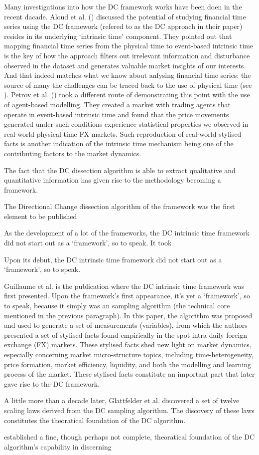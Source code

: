 Many investigations into how the DC framework works have been doen in the recent dacade. Aloud et al. (\citeyear{aloud2012directional}) discussed the potential of studying financial time series using the DC framework (refered to as the DC approach in their paper) resides in its underlying `intrinsic time' component. They pointed out that mapping financial time series from the physical time to event-based intrinsic time is the key of how the approach filters out irrelevant information and disturbance observed in the dataset and generates valuable market insights of our interests. And that indeed matches what we know about anlysing financial time series: the source of many the challenges can be traced back to the use of physical time (see \citeyear{genccay2001introduction}). Petrov et al. (\citeyear{petrov2018agent}) took a different route of demonstrating this point with the use of agent-based modelling. They created a market with trading agents that operate in event-based intrinsic time and found that the price movements generated under such conditions experience statistical properties we observed in real-world physical time FX markets. Such reproduction of real-world stylised facts is another indication of the intrinsic time mechanism being one of the contributing factors to the market dynamics. 


The fact that the DC dissection algorithm is able to extract qualitative and quantitative information has given rise to the methodology becoming a framework. 



The Directional Change dissection algorithm of the framework was the first element to be published 

As the development of a lot of the frameworks, the DC intrinsic time framework did not start out as a `framework', so to speak. It took

Upon its debut, the DC intrinsic time framework did not start out as a `framework', so to speak. 

Guillaume et al. \citeyear{guillaume1997bird} is the publication where the DC intrinsic time framework was first presented. Upon the framework's first appearance, it's yet a `framework', so to speak, because it simply was an sampling algorithm (the technical core mentioned in the previous paragraph). In this paper, the algorithm was proposed and used to generate a set of measurements (variables), from which the authors presented a set of stylised facts found empirically in the spot intra-daily foreign exchange (FX) markets. These stylised facts shed new light on market dynamics, especially concerning market micro-structure topics, including time-heterogeneity, price formation, market efficiency, liquidity, and both the modelling and learning process of the market. These stylised facts constitute an important part that later gave rise to the DC framework.

A little more than a decade later, Glattfelder et al. \citeyear{glattfelder2011patterns} discovered a set of twelve scaling laws derived from the DC sampling algorithm. The discovery of these laws constitutes the theoratical foundation of the DC algorithm. 

established a fine, though perhaps not complete, theoratical foundation of the DC algorithm's capability in discerning 
